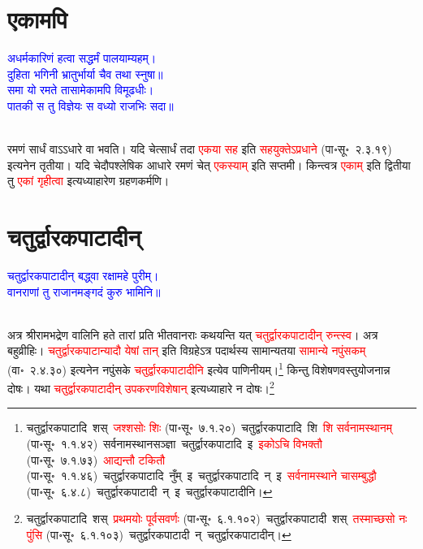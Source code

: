 \section[एकामपि]{एकामपि}
\centering\textcolor{blue}{अधर्मकारिणं हत्वा सद्धर्मं पालयाम्यहम्।\nopagebreak\\
दुहिता भगिनी भ्रातुर्भार्या चैव तथा स्नुषा॥\\
समा यो रमते तासामेकामपि विमूढधीः।\nopagebreak\\
पातकी स तु विज्ञेयः स वध्यो राजभिः सदा॥}\nopagebreak\\
\\
\begin{sloppypar}\justifying\noindent\hspace{10mm} रमणं सार्धं वाऽऽधारे वा भवति। यदि चेत्सार्धं तदा \textcolor{red}{एकया सह} इति \textcolor{red}{सह\-युक्तेऽप्रधाने} (पा॰सू॰~२.३.१९) इत्यनेन तृतीया। यदि चेदौपश्लेषिक आधारे रमणं चेत् \textcolor{red}{एकस्याम्‌} इति सप्तमी। किन्त्वत्र \textcolor{red}{एकाम्‌} इति द्वितीया तु \textcolor{red}{एकां गृहीत्वा} इत्यध्याहारेण ग्रहण\-कर्मणि।\end{sloppypar}
\section[चतुर्द्वारकपाटादीन्]{चतुर्द्वारकपाटादीन्‌}
\centering\textcolor{blue}{चतुर्द्वारकपाटादीन् बद्ध्वा रक्षामहे पुरीम्।\nopagebreak\\
वानराणां तु राजानमङ्गदं कुरु भामिनि॥}\nopagebreak\\
\\
\begin{sloppypar}\justifying\noindent\hspace{10mm} अत्र श्रीरामभद्रेण वालिनि हते तारां प्रति भीत\-वानराः कथयन्ति यत् \textcolor{red}{चतुर्द्वारकपाटादीन् रुन्त्स्व}। अत्र बहुव्रीहिः। \textcolor{red}{चतुर्द्वार\-कपाटान्यादौ येषां तान्‌} इति विग्रहेऽत्र पदार्थस्य सामान्यतया \textcolor{red}{सामान्ये नपुंसकम्‌} (वा॰~२.४.३०) इत्यनेन नपुंसके \textcolor{red}{चतुर्द्वार\-कपाटादीनि} इत्येव पाणिनीयम्।\footnote{चतुर्द्वार\-कपाटादि~शस्~\arrow \textcolor{red}{जश्शसोः शिः} (पा॰सू॰~७.१.२०)~\arrow चतुर्द्वार\-कपाटादि~शि~\arrow \textcolor{red}{शि सर्वनामस्थानम्} (पा॰सू॰~१.१.४२)~\arrow सर्वनाम\-स्थान\-सञ्ज्ञा~\arrow चतुर्द्वार\-कपाटादि~इ~\arrow \textcolor{red}{इकोऽचि विभक्तौ} (पा॰सू॰~७.१.७३)~\arrow \textcolor{red}{आद्यन्तौ टकितौ} (पा॰सू॰~१.१.४६)~\arrow चतुर्द्वार\-कपाटादि~नुँम्~इ~\arrow चतुर्द्वार\-कपाटादि~न्~इ~\arrow \textcolor{red}{सर्वनामस्थाने चासम्बुद्धौ} (पा॰सू॰~६.४.८)~\arrow चतुर्द्वार\-कपाटादी~न्~इ~\arrow चतुर्द्वार\-कपाटादीनि।} किन्तु विशेषण\-वस्तु\-योजनान्न दोषः। यथा \textcolor{red}{चतुर्द्वार\-कपाटादीन् उपकरण\-विशेषान्‌} इत्यध्याहारे न दोषः।\footnote{चतुर्द्वार\-कपाटादि~शस्~\arrow \textcolor{red}{प्रथमयोः पूर्वसवर्णः} (पा॰सू॰~६.१.१०२)~\arrow चतुर्द्वार\-कपाटादी~शस्~\arrow \textcolor{red}{तस्माच्छसो नः पुंसि} (पा॰सू॰~६.१.१०३)~\arrow चतुर्द्वार\-कपाटादी~न्~\arrow चतुर्द्वार\-कपाटादीन्।}\end{sloppypar}
